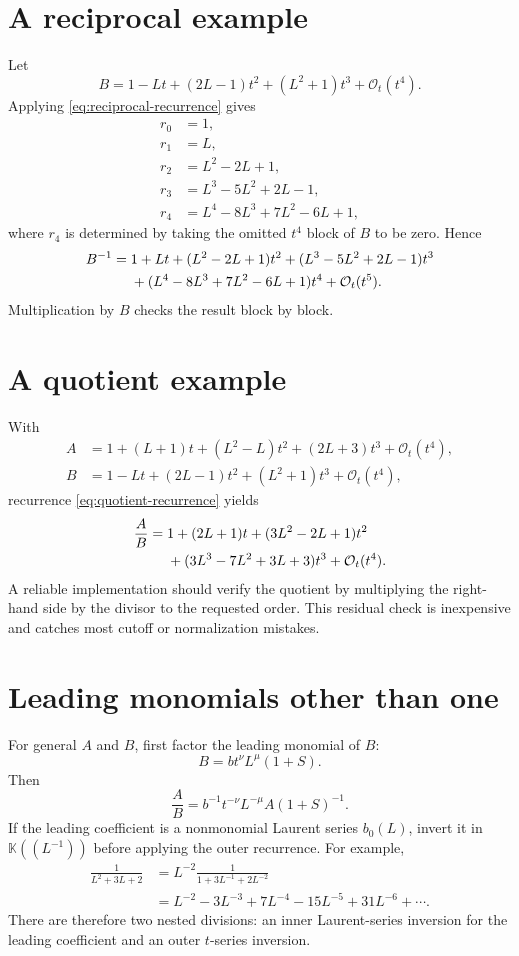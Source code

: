 \documentclass[11pt,oneside]{book}
\theoremstyle{definition}
\theoremstyle{remark}
\newcommand{\K}{\mathbb K}
\newcommand{\bigO}{\mathcal O}
\begin{document}
\section{A reciprocal example}
Let
\[
 B=1-Lt+(2L-1)t^2+(L^2+1)t^3+\bigO_t(t^4).
\]
Applying \eqref{eq:reciprocal-recurrence} gives
\begin{align*}
 r_0&=1,\\
 r_1&=L,\\
 r_2&=L^2-2L+1,\\
 r_3&=L^3-5L^2+2L-1,\\
 r_4&=L^4-8L^3+7L^2-6L+1,
\end{align*}
where $r_4$ is determined by taking the omitted $t^4$ block of $B$ to be
zero.  Hence
\begin{align}\label{eq:reciprocal-example}
 B^{-1}={}&1+Lt+(L^2-2L+1)t^2
 +(L^3-5L^2+2L-1)t^3\notag\\
 &+(L^4-8L^3+7L^2-6L+1)t^4+\bigO_t(t^5).
\end{align}
Multiplication by $B$ checks the result block by block.

\section{A quotient example}
With
\begin{align*}
 A&=1+(L+1)t+(L^2-L)t^2+(2L+3)t^3+\bigO_t(t^4),\\
 B&=1-Lt+(2L-1)t^2+(L^2+1)t^3+\bigO_t(t^4),
\end{align*}
recurrence \eqref{eq:quotient-recurrence} yields
\begin{align}\label{eq:quotient-example}
 \frac AB={}&1+(2L+1)t+(3L^2-2L+1)t^2\notag\\
 &+(3L^3-7L^2+3L+3)t^3+\bigO_t(t^4).
\end{align}
A reliable implementation should verify the quotient by multiplying the
right-hand side by the divisor to the requested order.  This residual check
is inexpensive and catches most cutoff or normalization mistakes.

\section{Leading monomials other than one}
For general $A$ and $B$, first factor the leading monomial of $B$:
\[
 B=b t^\nu L^\mu(1+S).
\]
Then
\[
 \frac AB=b^{-1}t^{-\nu}L^{-\mu}A(1+S)^{-1}.
\]
If the leading coefficient is a nonmonomial Laurent series $b_0(L)$, invert
it in $\K((L^{-1}))$ before applying the outer recurrence.  For example,
\begin{align*}
 \frac{1}{L^2+3L+2}
 &=L^{-2}\frac1{1+3L^{-1}+2L^{-2}}\\
 &=L^{-2}-3L^{-3}+7L^{-4}-15L^{-5}+31L^{-6}+\cdots.
\end{align*}
There are therefore two nested divisions: an inner Laurent-series inversion
for the leading coefficient and an outer $t$-series inversion.
\end{document}
